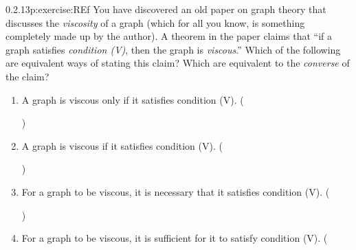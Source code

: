 \documentclass[twoside,11pt,]{book}
\numberwithin{equation}{chapter}
\begin{document}
\begin{divisionsolution}{0.2.13}{}{p:exercise:REf}%
You have discovered an old paper on graph theory that discusses the \emph{viscosity} of a graph (which for all you know, is something completely made up by the author). A theorem in the paper claims that ``if a graph satisfies \emph{condition (V)}, then the graph is \emph{viscous}.'' Which of the following are equivalent ways of stating this claim? Which are equivalent to the \emph{converse} of the claim?%
\begin{enumerate}[label=(\alph*)]
\item{}A graph is viscous only if it satisfies condition (V). \quad()\quad
%
\item{}A graph is viscous if it satisfies condition (V). \quad()\quad
%
\item{}For a graph to be viscous, it is necessary that it satisfies condition (V). \quad()\quad
%
\item{}For a graph to be viscous, it is sufficient for it to satisfy condition (V). \quad(
\end{enumerate}
\end{divisionsolution}
\end{document}
